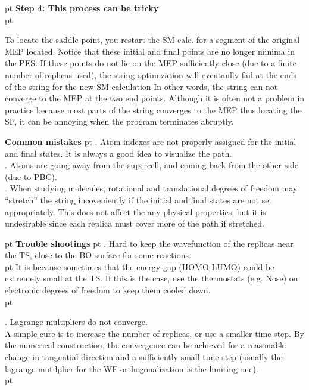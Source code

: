 \documentclass[aps,prb,preprint,groupedaddress]{revtex4}
\begin{document}
 pt
{\bf Step 4: This process can be tricky } \\
 pt
\begin{minipage}{6in}
To locate the saddle point, you restart the SM calc. for a 
segment of the original MEP located. Notice that these initial and final
points are no longer minima in the PES. 
If these points do not lie on the MEP sufficiently close  
(due to a finite number of replicas used), the string optimization
will eventaully fail at the ends of the string for the new SM calculation
In other words, the string can not converge to the MEP at the two end points.
Although it is often not a problem in practice because most
parts of the string converges to the MEP thus locating the SP, it can 
be annoying when the program terminates abruptly.
\end{minipage}


\newpage
\noindent
{\large \bf Common mistakes}
 pt
. Atom indexes are not properly assigned for the initial and final states. It is always a good idea to visualize the path.\\
\vskip 5pt
. Atoms are going away from the supercell, and coming back from the other side (due to PBC). \\
\vskip 5pt
. When studying molecules, rotational and translational degrees of freedom may ``stretch'' the string incoveniently if
the initial and final states are not set appropriately. This does not affect the any physical properties, but it is undesirable
since each replica must cover more of the path if stretched. \\
\vskip 5pt

 pt
\noindent
{\large \bf Trouble shootings}
 pt
. Hard to keep the wavefunction of the replicas near the TS, close to the BO surface for some reactions. \\
 pt
\noindent
It is because sometimes that the energy gap (HOMO-LUMO) could be extremely small at the TS. If this is the case,
use the thermostats (e.g. Nose) on electronic degrees of freedom to keep them cooled down.   \\
 pt

. Lagrange multipliers do not converge.  \\
\vskip 7pt
\noindent
A simple cure is to increase the number of
replicas, or use a smaller time step. By the numerical construction, the convergence
can be achieved for a reasonable change in tangential direction and a sufficiently small time step (usually
the lagrange mutilplier for the WF orthogonalization is the limiting one). \\   
 pt
\end{document}
